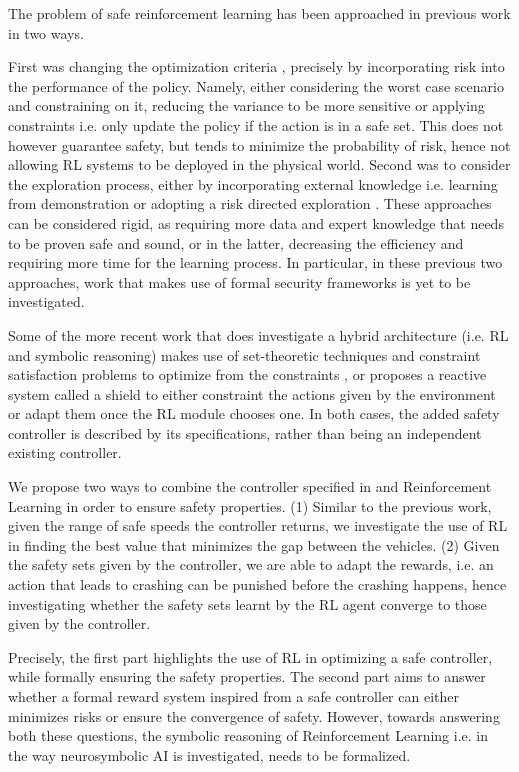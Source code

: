 \documentclass[a4paper,11pt]{article}
\begin{document}
\medskip


The problem of safe reinforcement learning has been approached in previous work \cite{Garca2015ACS} in two ways. 

First was changing the optimization criteria \cite{rockafellar2000}, precisely by incorporating risk into the performance of the policy.
Namely, either considering the worst case scenario and constraining on it, reducing the variance to be more sensitive or applying constraints i.e. only update the policy if the action is in a safe set. 
This does not however guarantee safety, but tends to minimize the probability of risk, hence not allowing RL systems to be deployed in the physical world. 
Second was to consider the exploration process, either by incorporating external knowledge i.e. learning from demonstration \cite{Siebel2007EvolutionaryRL} or adopting a risk directed exploration \cite{law2005}. These approaches can be considered rigid, 
as requiring more data and expert knowledge that needs to be proven safe and sound, or in the latter, decreasing the efficiency and requiring more time for the learning process. 
In particular, in these previous two approaches, work that makes use of formal security frameworks is yet to be investigated. 

\medskip

Some of the more recent work that does investigate a hybrid architecture (i.e. RL and symbolic reasoning) makes use of
set-theoretic techniques and constraint satisfaction problems to optimize from the constraints \cite{Li2021SafeRL}, or proposes a reactive system called a shield \cite{alshiekh2017} to either constraint the actions given by the environment or adapt them once the RL module chooses one. 
In both cases, the added safety controller is described by its specifications, rather than being an independent existing controller. 

\medskip
We propose two ways to combine the controller specified in \cite{vnc20} and Reinforcement Learning in order to ensure safety properties. 
(1) Similar to the previous work, given the range of safe speeds the controller returns, we investigate the use of  RL in finding the best value that minimizes the gap between the vehicles. 
(2) Given the safety sets given by the controller, we are able to adapt the rewards, i.e. an action that leads to crashing can be punished before the crashing happens, hence investigating whether the safety sets learnt
by the RL agent converge to those given by the controller. 

Precisely, the first part highlights the use of RL in optimizing a safe controller, while formally ensuring the safety properties. The second part aims to answer
whether a formal reward system inspired from a safe controller can either minimizes risks or ensure the convergence of safety. 
However, towards answering both these questions, the symbolic reasoning of Reinforcement Learning i.e. in the way neurosymbolic AI is investigated, needs to be formalized. 




\end{document}
